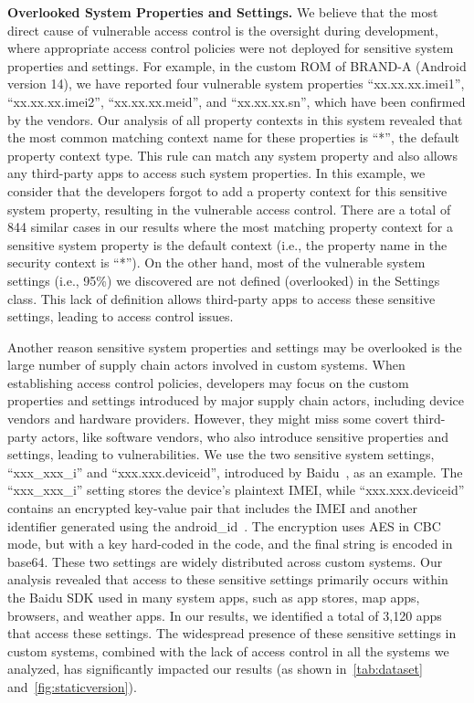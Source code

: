 \noindent \textbf{Overlooked System Properties and Settings.}
We believe that the most direct cause of vulnerable access control is the oversight during development, where appropriate access control policies were not deployed for sensitive system properties and settings.
For example, in the custom ROM of BRAND-A (Android version 14), we have reported four vulnerable system properties ``xx.xx.xx.imei1'', ``xx.xx.xx.imei2'', ``xx.xx.xx.meid'', and ``xx.xx.xx.sn'', which have been confirmed by the vendors.
Our analysis of all property contexts in this system revealed that the most common matching context name for these properties is ``*'', the default property context type. 
This rule can match any system property and also allows any third-party apps to access such system properties. 
In this example, we consider that the developers forgot to add a property context for this sensitive system property, resulting in the vulnerable access control.
There are a total of 844 similar cases in our results where the most matching property context for a sensitive system property is the default context (i.e., the property name in the security context is ``*''). 
On the other hand, most of the vulnerable system settings (i.e., 95\%) we discovered are not defined (overlooked) in the Settings class. 
This lack of definition allows third-party apps to access these sensitive settings, leading to access control issues.

Another reason sensitive system properties and settings may be overlooked is the large number of supply chain actors involved in custom systems.
When establishing access control policies, developers may focus on the custom properties and settings introduced by major supply chain actors, including device vendors and hardware providers.
However, they might miss some covert third-party actors, like software vendors, who also introduce sensitive properties and settings, leading to vulnerabilities.
We use the two sensitive system settings, ``xxx\_xxx\_i'' and ``xxx.xxx.deviceid'', introduced by Baidu~\cite{baidu}, as an example.
The ``xxx\_xxx\_i'' setting stores the device's plaintext IMEI, while ``xxx.xxx.deviceid'' contains an encrypted key-value pair that includes the IMEI and another identifier generated using the android\_id~\cite{androidid}. 
The encryption uses AES in CBC mode, but with a key hard-coded in the code, and the final string is encoded in base64.
These two settings are widely distributed across custom systems.
Our analysis revealed that access to these sensitive settings primarily occurs within the Baidu SDK used in many system apps, such as app stores, map apps, browsers, and weather apps.
In our results, we identified a total of 3,120 apps that access these settings. 
The widespread presence of these sensitive settings in custom systems, combined with the lack of access control in all the systems we analyzed, has significantly impacted our results (as shown in~\autoref{tab:dataset} and~\autoref{fig:staticversion}).


